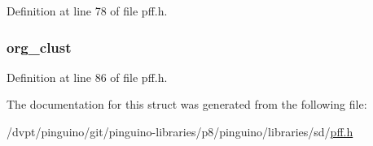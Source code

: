 Definition at line 78 of file pff.\-h.

\hypertarget{struct___f_a_t_f_s___a5203f761bacf25758b7e736215f74349}{
\subsubsection[{org\-\_\-clust}]{ org\-\_\-clust}}\label{struct___f_a_t_f_s___a5203f761bacf25758b7e736215f74349}


Definition at line 86 of file pff.\-h.



The documentation for this struct was generated from the following file\-:\begin{DoxyCompactItemize}
\item 
/dvpt/pinguino/git/pinguino-\/libraries/p8/pinguino/libraries/sd/\hyperlink{pff_8h}{pff.\-h}\end{DoxyCompactItemize}

